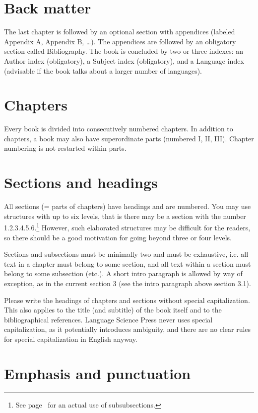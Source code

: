 \section{Back matter}

The last chapter is followed by an optional section with appendices (labeled Appendix A, Appendix B,
\ldots).  The appendices are followed by an obligatory section called Bibliography.  The book is
concluded by two or three indexes: an Author index (obligatory), a Subject index (obligatory), and a
Language index (advisable if the book talks about a larger number of languages).  

\section{Chapters}

Every book is divided into consecutively numbered chapters. In addition to chapters, a book may also
have superordinate parts (numbered I, II, III). Chapter numbering is not restarted within parts.




\section{Sections and headings}

All sections (= parts of chapters) have headings and are numbered. You may use structures with up to
six levels, that is there may be a section with the number 1.2.3.4.5.6.\footnote{
  See page~\pageref{sec-Chinese} for an actual use of subsubsections.%
} However, such elaborated
structures may be difficult for the readers, so there should be a good motivation for going beyond
three or four levels.

Sections and subsections must be minimally two and must be exhaustive, i.e. all text in a chapter
must belong to some section, and all text within a section must belong to some subsection (etc.). A
short intro paragraph is allowed by way of exception, as in the current section 3 (see the intro
paragraph above section 3.1).

Please write the headings of chapters and sections without special capitalization. This also applies
to the title (and subtitle) of the book itself and to the bibliographical references. Language
Science Press never uses special capitalization, as it potentially introduces ambiguity, and there
are no clear rules for special capitalization in English anyway.


\section{Emphasis and punctuation}

